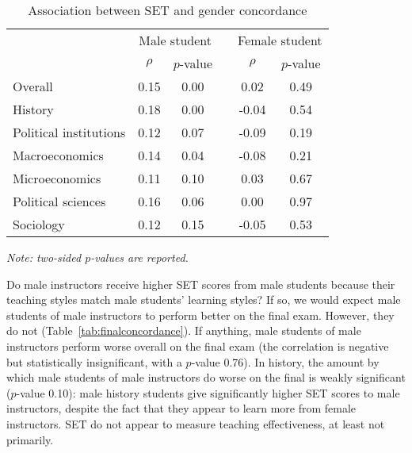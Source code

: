 \documentclass[12pt]{article}
\begin{document}
\begin{table}[htbp]
  \centering
  \footnotesize 
  \caption{Association between SET and gender concordance}
    \begin{tabular}{lccccc}
    \toprule 
          & \multicolumn{2}{c}{Male student}  &  & \multicolumn{2}{c}{Female student} \\
      & $\rho$  &  $p$-value &  & $\rho$  &  $p$-value    \\
   \midrule
      \quad  Overall &                 0.15       & 0.00 & &  0.02       & 0.49      \\
      \quad  History &                 0.18       & 0.00 & & -0.04       & 0.54      \\
      \quad  Political institutions &  0.12       & 0.07 & & -0.09       & 0.19       \\
      \quad  Macroeconomics &          0.14       & 0.04 & & -0.08       & 0.21     \\
      \quad  Microeconomics &          0.11       & 0.10 & &  0.03       & 0.67       \\
      \quad  Political sciences &      0.16       & 0.06 & &  0.00       & 0.97      \\
      \quad  Sociology &               0.12       & 0.15 & & -0.05       & 0.53      \\
    \bottomrule
    \end{tabular}%
 \label{tab:genderconcordance}%
  
  \textit{Note: two-sided $p$-values are reported.}
\end{table}%
\normalsize

Do male instructors receive higher SET scores from male students because their 
teaching styles match male students' learning styles? 
If so, we would expect male students of male instructors to perform better on the final exam. 
However, they do not (Table~\ref{tab:finalconcordance}). 
If anything, male students of male instructors perform worse overall on the final exam (the correlation is negative but statistically insignificant, with a $p$-value 0.76). 
In history, the amount by which male students of male instructors do worse on the final
is weakly significant ($p$-value 0.10):
male history students give significantly higher SET scores to male instructors, despite the fact that 
they appear to learn more from female instructors. 
SET do not appear to measure teaching effectiveness, at least not primarily.
\end{document}
